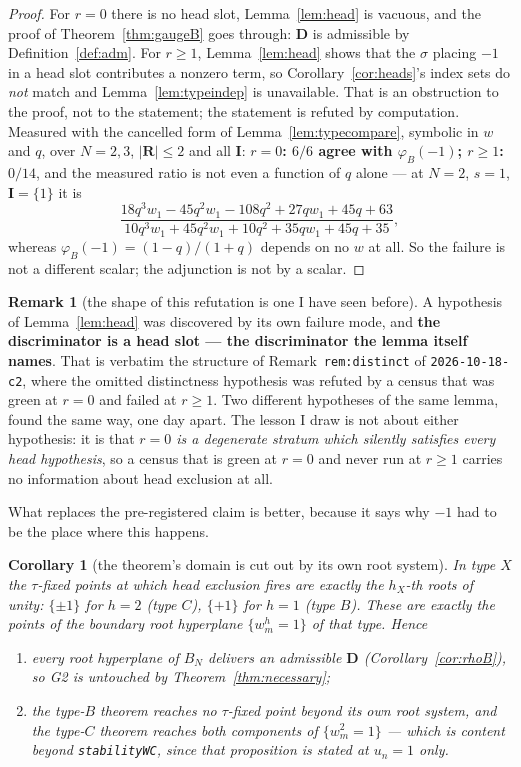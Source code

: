 \documentclass[11pt]{article}
\newtheorem{cor}[thm]{Corollary}
\theoremstyle{definition}
\newtheorem{rem}[thm]{Remark}
\newcommand{\bI}{\mathbf{I}}
\newcommand{\bD}{\mathbf{D}}
\newcommand{\bR}{\mathbf{R}}
\begin{document}
\begin{proof}
For $r=0$ there is no head slot, Lemma~\ref{lem:head} is vacuous, and the proof
of Theorem~\ref{thm:gaugeB} goes through: $\bD$ is admissible by
Definition~\ref{def:adm}.  For $r\ge1$, Lemma~\ref{lem:head} shows that the
$\sigma$ placing $-1$ in a head slot contributes a nonzero term, so
Corollary~\ref{cor:heads}'s index sets do \emph{not} match and
Lemma~\ref{lem:typeindep} is unavailable.  That is an obstruction to the proof,
not to the statement; the statement is refuted by computation.  Measured with
the cancelled form of Lemma~\ref{lem:typecompare}, symbolic in $w$ and $q$, over
$N=2,3$, $|\bR|\le2$ and all $\bI$: \textbf{$r=0$: $6/6$ agree with
$\varphi_B(-1)$; $r\ge1$: $0/14$}, and the measured ratio is not even a function
of $q$ alone --- at
$N=2$, $s=1$, $\bI=\{1\}$ it is
\[
  \frac{18q^{3}w_1-45q^{2}w_1-108q^{2}+27qw_1+45q+63}
       {10q^{3}w_1+45q^{2}w_1+10q^{2}+35qw_1+45q+35},
\]
whereas $\varphi_B(-1)=(1-q)/(1+q)$ depends on no $w$ at all.  So the failure is
not a different scalar; the adjunction is not by a scalar.
\end{proof}

\begin{rem}[the shape of this refutation is one I have seen before]
A hypothesis of Lemma~\ref{lem:head} was discovered by its own failure mode, and
\textbf{the discriminator is a head slot --- the discriminator the lemma itself
names}.  That is verbatim the structure of
Remark~\texttt{rem:distinct} of \texttt{2026-10-18-c2}, where the omitted
distinctness hypothesis was refuted by a census that was green at $r=0$ and
failed at $r\ge1$.  Two different hypotheses of the same lemma, found the same
way, one day apart.  The lesson I draw is not about either hypothesis: it is that
\emph{$r=0$ is a degenerate stratum which silently satisfies every head
hypothesis}, so a census that is green at $r=0$ and never run at $r\ge1$ carries
no information about head exclusion at all.
\end{rem}

\noindent
What replaces the pre-registered claim is better, because it says why $-1$ had to
be the place where this happens.

\begin{cor}[the theorem's domain is cut out by its own root system]
\label{cor:domain}
In type $X$ the $\tau$-fixed points at which head exclusion fires are exactly
the $h_X$-th roots of unity: $\{\pm1\}$ for $h=2$ (type $C$), $\{+1\}$ for $h=1$
(type $B$).  These are exactly the points of the boundary root hyperplane
$\{w_m^{h}=1\}$ of that type.  Hence
\begin{enumerate}
\item every root hyperplane of $B_N$ delivers an admissible $\bD$
  (Corollary~\ref{cor:rhoB}), so G2 is untouched by
  Theorem~\ref{thm:necessary};
\item the type-$B$ theorem reaches no $\tau$-fixed point beyond its own root
  system, and the type-$C$ theorem reaches both components of $\{w_m^{2}=1\}$
  --- which \emph{is} content beyond \texttt{stabilityWC}, since that
  proposition is stated at $u_n=1$ only.
\end{enumerate}
\end{cor}
\end{document}
